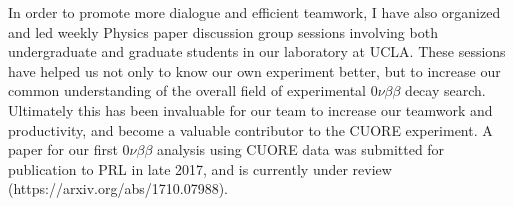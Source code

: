 \documentclass[10pt]{article} %
\begin{document}
In order to promote more dialogue and efficient teamwork, I have also organized
and led weekly Physics paper discussion group sessions involving both
undergraduate and graduate students in our laboratory at UCLA. These sessions
have helped us not only to know our own experiment better, but to increase our
common understanding of the overall field of experimental $0\nu\beta\beta$
decay search. Ultimately this has been invaluable for our team to increase
our teamwork and productivity, and become a valuable contributor to the CUORE
experiment. A paper for our first $0\nu\beta\beta$ analysis using CUORE data
was submitted for publication to PRL in late 2017, and is currently under
review (https://arxiv.org/abs/1710.07988).


%
\end{document}
